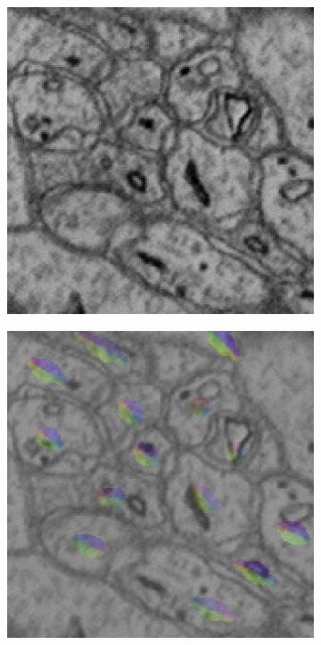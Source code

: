 \begin{figure}[htpb]
	\newcommand{\mywidth}{0.3\textwidth}
	\centering
	\begin{subfigure}[b]{\mywidth}
		\centering
		\includegraphics[width=\textwidth]{data/images/fieldLearning/fi_image.png}
		\caption{\label{fig:fi_im}}
	\end{subfigure}
	\hspace{3mm}
	\begin{subfigure}[b]{\mywidth}
		\centering
		\includegraphics[width=\textwidth]{data/images/fieldLearning/fi_im_field.png}
		\caption{\label{fig:fi_im_f}}
	\end{subfigure}\\
	

\end{figure}
